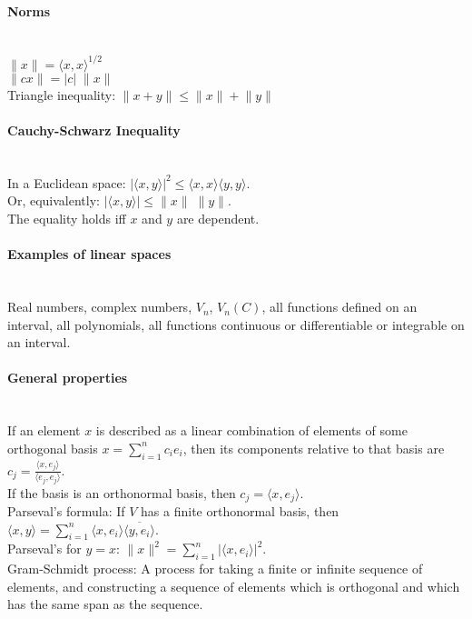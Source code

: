\documentclass[10pt]{article}
\begin{document}
\paragraph{Norms}\ \\
$\lVert x \rVert = \langle x,x\rangle^{1/2}$\\
$\lVert cx \rVert = |c|\; \lVert x \rVert$\\
Triangle inequality: $\lVert x + y \rVert \leq \lVert x \rVert + \lVert y \rVert$

\paragraph{Cauchy-Schwarz Inequality}\ \\ 
In a Euclidean space: $|\langle x,y\rangle|^2 \leq \langle x,x\rangle \langle y,y \rangle$.\\
Or, equivalently: $|\langle x, y\rangle| \leq \lVert x\rVert\;\lVert y\rVert$.\\
The equality holds iff $x$ and $y$ are dependent.

\paragraph{Examples of linear spaces}\ \\
Real numbers, complex numbers, $V_n$, $V_n(C)$, all functions defined on an interval, all polynomials,
all functions continuous or differentiable or integrable on an interval.

\paragraph{General properties}\ \\
If an element $x$ is described as a linear combination of elements of some orthogonal basis $x=\sum_{i=1}^nc_ie_i$, 
then its components relative to that basis are $c_j=\frac{\langle x, e_j\rangle}{\langle e_j, e_j \rangle}$.\\
If the basis is an orthonormal basis, then $c_j = \langle x, e_j \rangle$.\\
Parseval's formula: If $V$ has a finite orthonormal basis, then
$\langle x, y \rangle = \sum_{i=1}^n \langle x, e_i \rangle \overline{\langle y, e_i \rangle}$.\\
Parseval's for $y = x$: $\lVert x \rVert^2 = \sum_{i=1}^n |\langle x, e_i \rangle|^2$.\\
Gram-Schmidt process: A process for taking a finite or infinite sequence of elements, and 
constructing a sequence of elements which is orthogonal and which has the same span as the sequence.
\end{document}
